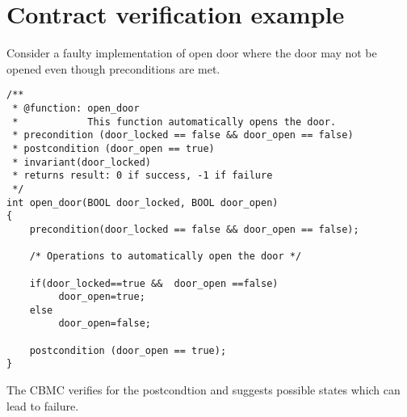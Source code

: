 \chapter{Contract verification example} \label{appendix:b}

Consider a faulty implementation of open door where the door may not be opened even though preconditions are met.

\begin{lstlisting}
/**
 * @function: open_door
 *            This function automatically opens the door.
 * precondition (door_locked == false && door_open == false)
 * postcondition (door_open == true)
 * invariant(door_locked)
 * returns result: 0 if success, -1 if failure
 */
int open_door(BOOL door_locked, BOOL door_open)
{
    precondition(door_locked == false && door_open == false);

    /* Operations to automatically open the door */

    if(door_locked==true &&  door_open ==false)
         door_open=true;
    else
         door_open=false;

    postcondition (door_open == true);
}

\end{lstlisting}

The CBMC verifies for the postcondtion and suggests possible states which can lead to failure.

